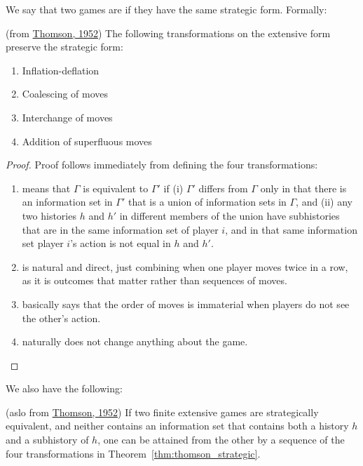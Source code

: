\documentclass[10pt]{article}
\begin{document}
\begin{definition}
	We say that two games are  if they have the same strategic form. Formally:
\end{definition}
\begin{theorem}\label{thm:thomson_strategic}
	(from \href{https://www.rand.org/content/dam/rand/pubs/research_memoranda/2009/RM759.pdf}{Thomson, 1952}) The following transformations on the extensive form preserve the strategic form:
	\begin{enumerate}
		\item Inflation-deflation
		\item Coalescing of moves
		\item Interchange of moves
		\item Addition of superfluous moves
	\end{enumerate}
\end{theorem}
\begin{proof}
	Proof follows immediately from defining the four transformations:
	\begin{enumerate}
		\item {} means that $\Gamma$ is equivalent to $\Gamma'$ if (i) $\Gamma'$ differs from $\Gamma$ only in that there is an information set in $\Gamma'$ that is a union of information sets in $\Gamma$, and (ii) any two histories $h$ and $h'$ in different members of the union have subhistories that are in the same information set of player $i$, and in that same information set player $i$'s action is not equal in $h$ and $h'$.
		\item {} is natural and direct, just combining when one player moves twice in a row, as it is outcomes that matter rather than sequences of moves.
		\item {} basically says that the order of moves is immaterial when players do not see the other's action.
		\item {} naturally does not change anything about the game.
	\end{enumerate}
\end{proof}

We also have the following:
\begin{corollary}
	(aslo from \href{https://www.rand.org/content/dam/rand/pubs/research_memoranda/2009/RM759.pdf}{Thomson, 1952}) If two finite extensive games are strategically equivalent, and neither contains an information set that contains both a history $h$ and a subhistory of $h$, one can be attained from the other by a sequence of the four transformations in Theorem~\ref{thm:thomson_strategic}.
\end{corollary}
\end{document}
